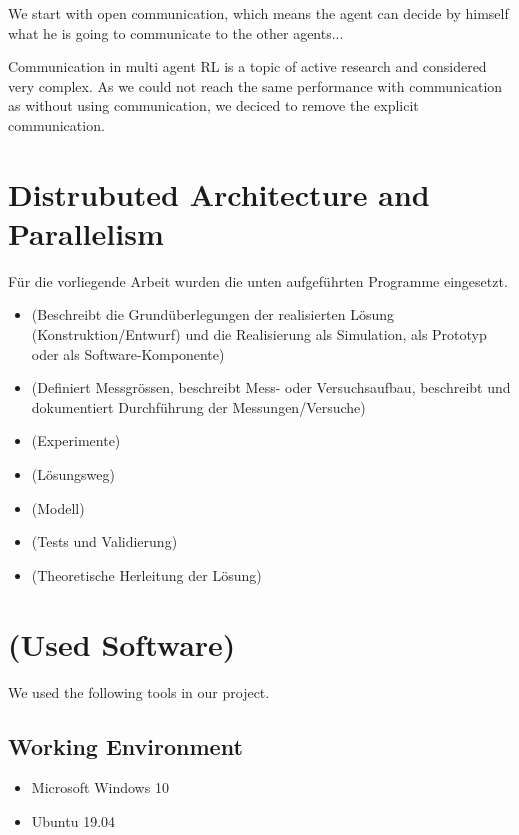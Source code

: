 We start with open communication, which means the agent can decide by himself what he is going to communicate to the other agents... %

Communication in multi agent RL is a topic of active research and considered very complex. As we could not reach the same performance with communication as without using communication, we deciced to remove the explicit communication.




\section{Distrubuted Architecture and Parallelism}\label{dist_architecture}
Für die vorliegende Arbeit wurden die unten aufgeführten Programme eingesetzt.








\begin{itemize}
\item (Beschreibt die Grundüberlegungen der realisierten Lösung (Konstruktion/Entwurf) und die Realisierung als Simulation, als Prototyp oder als Software-Komponente)
\item (Definiert Messgrössen, beschreibt Mess- oder Versuchsaufbau, beschreibt und dokumentiert Durchführung der Messungen/Versuche)
\item (Experimente)
\item (Lösungsweg)
\item (Modell)
\item (Tests und Validierung)
\item (Theoretische Herleitung der Lösung)
\end{itemize}

\section{(Used Software)}\label{software}
We used the following tools in our project.

\subsection*{Working Environment}\label{os}
\begin{itemize}
	\item Microsoft Windows 10
	\item Ubuntu 19.04
\end{itemize}

